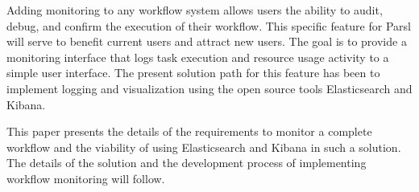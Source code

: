 Adding monitoring to any workflow system allows users the ability to audit, debug, and confirm the execution of their workflow.
This specific feature for Parsl will serve to benefit current users and attract new users.
The goal is to provide a monitoring interface that logs task execution and resource usage activity to a simple user interface.
The present solution path for this feature has been to implement logging and visualization using the open source tools Elasticsearch and Kibana.

This paper presents the details of the requirements to monitor a complete workflow and the viability of using Elasticsearch and Kibana in such a solution.
The details of the solution and the development process of implementing workflow monitoring will follow.
